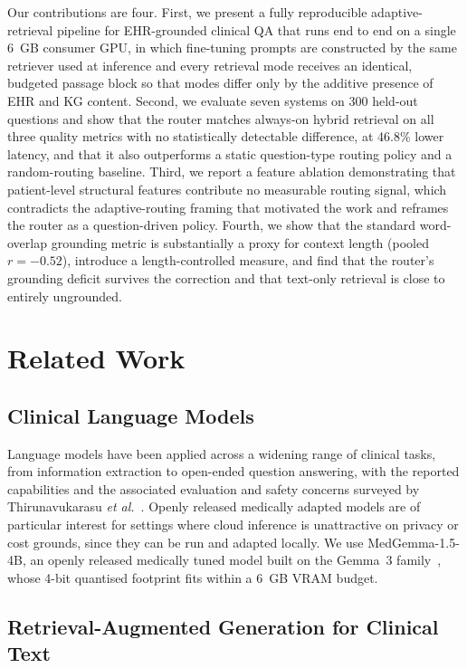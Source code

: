 \documentclass[preprint,12pt]{elsarticle}
\begin{document}
Our contributions are four. First, we present a fully reproducible
adaptive-retrieval pipeline for EHR-grounded clinical QA that runs
end to end on a single 6~GB consumer GPU, in which fine-tuning prompts
are constructed by the same retriever used at inference and every
retrieval mode receives an identical, budgeted passage block so that
modes differ only by the additive presence of EHR and KG content.
Second, we evaluate seven systems on 300 held-out questions and show
that the router matches always-on hybrid retrieval on all three
quality metrics with no statistically detectable difference, at 46.8\%
lower latency, and that it also outperforms a static question-type
routing policy and a random-routing baseline. Third, we report a
feature ablation demonstrating that patient-level structural features
contribute no measurable routing signal, which contradicts the
adaptive-routing framing that motivated the work and reframes the
router as a question-driven policy. Fourth, we show that the standard
word-overlap grounding metric is substantially a proxy for context
length (pooled $r = -0.52$), introduce a length-controlled measure,
and find that the router's grounding deficit survives the correction
and that text-only retrieval is close to entirely ungrounded.

\section{Related Work}

\subsection{Clinical Language Models}

Language models have been applied across a widening range of clinical
tasks, from information extraction to open-ended question answering,
with the reported capabilities and the associated evaluation and
safety concerns surveyed by Thirunavukarasu \textit{et
al.}~\cite{thirunavukarasu2023}. Openly released medically adapted
models are of particular interest for settings where cloud inference
is unattractive on privacy or cost grounds, since they can be run and
adapted locally. We use MedGemma-1.5-4B, an openly released medically
tuned model built on the Gemma~3 family~\cite{medgemma2025}, whose
4-bit quantised footprint fits within a 6~GB VRAM budget.

\subsection{Retrieval-Augmented Generation for Clinical Text}
\end{document}
